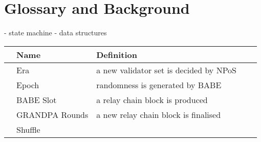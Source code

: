 \section{Glossary and Background}

- state machine
- data structures

\begin{table}[h]
\begin{tabular}{lllll}
& \textbf{Name}  & \textbf{Definition} \\
\hline
& Era  & a new validator set is decided by NPoS \\
& Epoch & randomness is generated by BABE\\
& BABE Slot & a relay chain block is produced \\
& GRANDPA Rounds & a new relay chain block is finalised  \\
& Shuffle &  \\
\end{tabular}
\end{table}
